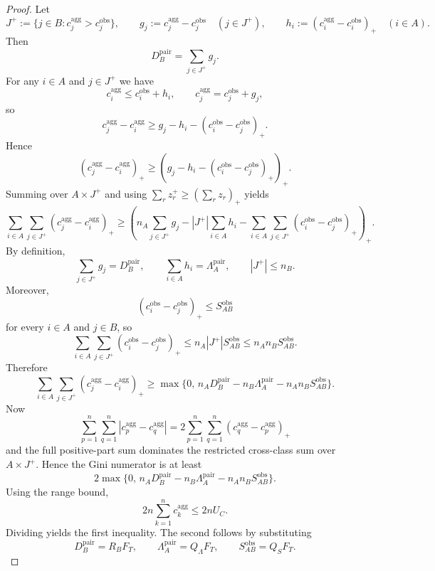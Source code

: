 \documentclass[11pt]{article}
\newcommand{\1}{\mathbf{1}}
\theoremstyle{definition}
\theoremstyle{plain}
\theoremstyle{remark}
\begin{document}
\begin{proof}
Let
\[
J^+ := \{j\in B : c_j^{\mathrm{agg}} > c_j^{\mathrm{obs}}\},
\qquad
g_j := c_j^{\mathrm{agg}} - c_j^{\mathrm{obs}} \quad (j\in J^+),
\qquad
h_i := (c_i^{\mathrm{agg}} - c_i^{\mathrm{obs}})_+ \quad (i\in A).
\]
Then
\[
D_B^{\mathrm{pair}} = \sum_{j\in J^+} g_j.
\]
For any $i\in A$ and $j\in J^+$ we have
\[
c_i^{\mathrm{agg}} \le c_i^{\mathrm{obs}} + h_i,
\qquad
c_j^{\mathrm{agg}} = c_j^{\mathrm{obs}} + g_j,
\]
so
\[
c_j^{\mathrm{agg}} - c_i^{\mathrm{agg}}
\ge
g_j - h_i - (c_i^{\mathrm{obs}} - c_j^{\mathrm{obs}})_+.
\]
Hence
\[
(c_j^{\mathrm{agg}} - c_i^{\mathrm{agg}})_+
\ge
\left(g_j - h_i - (c_i^{\mathrm{obs}} - c_j^{\mathrm{obs}})_+\right)_+.
\]
Summing over $A \times J^+$ and using $\sum_r z_r^+ \ge (\sum_r z_r)_+$ yields
\[
\sum_{i\in A}\sum_{j\in J^+}(c_j^{\mathrm{agg}} - c_i^{\mathrm{agg}})_+
\ge
\left(
 n_A \sum_{j\in J^+} g_j
 - |J^+| \sum_{i\in A} h_i
 - \sum_{i\in A}\sum_{j\in J^+}(c_i^{\mathrm{obs}} - c_j^{\mathrm{obs}})_+
\right)_+.
\]
By definition,
\[
\sum_{j\in J^+} g_j = D_B^{\mathrm{pair}},
\qquad
\sum_{i\in A} h_i = \Lambda_A^{\mathrm{pair}},
\qquad
|J^+| \le n_B.
\]
Moreover,
\[
(c_i^{\mathrm{obs}} - c_j^{\mathrm{obs}})_+ \le S_{AB}^{\mathrm{obs}}
\]
for every $i\in A$ and $j\in B$, so
\[
\sum_{i\in A}\sum_{j\in J^+}(c_i^{\mathrm{obs}} - c_j^{\mathrm{obs}})_+
\le
n_A |J^+| S_{AB}^{\mathrm{obs}}
\le
n_A n_B S_{AB}^{\mathrm{obs}}.
\]
Therefore
\[
\sum_{i\in A}\sum_{j\in J^+}(c_j^{\mathrm{agg}} - c_i^{\mathrm{agg}})_+
\ge
\max\{0,\,
 n_A D_B^{\mathrm{pair}} - n_B \Lambda_A^{\mathrm{pair}} - n_A n_B S_{AB}^{\mathrm{obs}}
\}.
\]
Now
\[
\sum_{p=1}^n\sum_{q=1}^n |c_p^{\mathrm{agg}} - c_q^{\mathrm{agg}}|
=
2 \sum_{p=1}^n\sum_{q=1}^n (c_q^{\mathrm{agg}} - c_p^{\mathrm{agg}})_+
\]
and the full positive-part sum dominates the restricted cross-class sum over $A \times J^+$. Hence the Gini numerator is at least
\[
2\max\{0,\,
 n_A D_B^{\mathrm{pair}} - n_B \Lambda_A^{\mathrm{pair}} - n_A n_B S_{AB}^{\mathrm{obs}}
\}.
\]
Using the range bound,
\[
2n \sum_{k=1}^n c_k^{\mathrm{agg}} \le 2n U_C.
\]
Dividing yields the first inequality. The second follows by substituting
\[
D_B^{\mathrm{pair}} = R_B F_T,
\qquad
\Lambda_A^{\mathrm{pair}} = Q_\Lambda F_T,
\qquad
S_{AB}^{\mathrm{obs}} = Q_S F_T.
\]
\end{proof}
\end{document}
